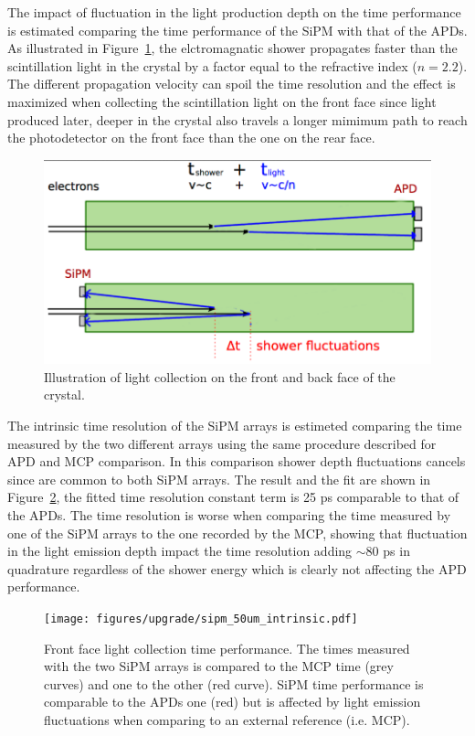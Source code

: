 The impact of fluctuation in the light production depth on the time performance is estimated comparing the
time performance of the SiPM with that of the APDs. As illustrated in Figure~\ref{fig:light_collection_scheme}, 
the elctromagnatic shower propagates faster than the scintillation light in the crystal by a factor equal
to the \PbWO refractive index ($n=2.2$). The different propagation velocity can spoil the time resolution and the
effect is maximized when collecting the scintillation light on the front face since light produced later, deeper in
the crystal also travels a longer mimimum path to reach the photodetector on the front face than the one on the rear face.

\begin{figure}[h!]
  \centering
  \includegraphics[width = .6\textwidth]{figures/upgrade/shower_fluct_cartoon.png}
  \caption{Illustration of light collection on the front and back face of the \PbWO crystal.}
  \label{fig:light_collection_scheme}
\end{figure}

The intrinsic time resolution of the SiPM arrays is estimeted comparing the time measured by the two different arrays using
the same procedure described for APD and MCP comparison. In this comparison shower depth fluctuations cancels since
are common to both SiPM arrays.
The result and the fit are shown in Figure~\ref{fig:sipm_tres},
the fitted time resolution constant term is 25 ps comparable to that of the APDs.
The time resolution is worse when comparing the time measured by one of the SiPM arrays to the one recorded by the MCP,
showing that fluctuation in the light emission depth impact the time resolution adding $\sim 80$ ps in quadrature regardless
of the shower energy which is clearly not affecting the APD performance.

\begin{figure}[h!]
  \centering
  \texttt{[image: figures/upgrade/sipm\_50um\_intrinsic.pdf]}
  \caption{Front face light collection time performance. The times measured with the two SiPM arrays
    is compared to the MCP time (grey curves) and one to the other (red curve). SiPM time performance is comparable
    to the APDs one (red) but is affected by light emission fluctuations when comparing to an external
    reference (i.e. MCP).}
  \label{fig:sipm_tres}
\end{figure}


